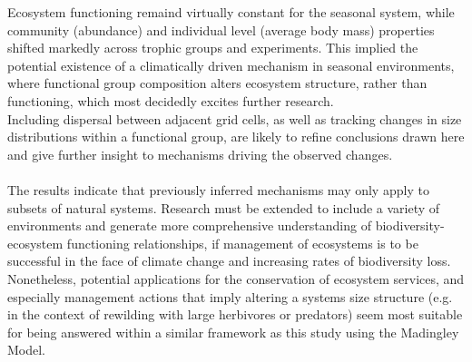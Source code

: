 Ecosystem functioning remaind virtually constant for the seasonal system, while community (abundance) and individual level (average body mass) properties shifted markedly across trophic groups and experiments. This implied the potential existence of a climatically driven mechanism in seasonal environments, where functional group composition alters ecosystem structure, rather than functioning, which most decidedly excites further research.
 \\
Including dispersal between adjacent grid cells, as well as tracking changes in size distributions within a functional group, are likely to refine conclusions drawn here and give further insight to mechanisms driving the observed changes. 
\\\\
The results indicate that previously inferred mechanisms may only apply to subsets of natural systems. Research must be extended to include a variety of environments and generate more comprehensive understanding of biodiversity-ecosystem functioning relationships, if management of ecosystems is to be successful in the face of climate change and increasing rates of biodiversity loss. 
\\
Nonetheless,  potential applications for the conservation of ecosystem services, and especially management actions that imply altering a systems size structure (e.g. in the context of rewilding with large herbivores or predators) seem most suitable for being answered within a similar framework as this study using the Madingley Model.
\\\\
